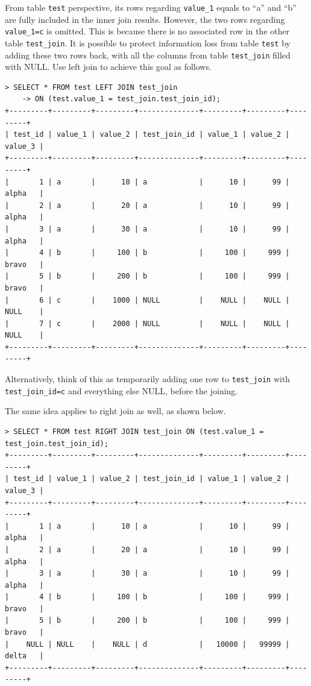 From table \verb|test| perspective, its rows regarding \verb|value_1| equals to ``a'' and ``b'' are fully included in the inner join results. However, the two rows regarding \verb|value_1=c| is omitted. This is because there is no associated row in the other table \verb|test_join|. It is possible to protect information loss from table \verb|test| by adding these two rows back, with all the columns from table \verb|test_join| filled with NULL. Use left join to achieve this goal as follows.
\begin{lstlisting}
> SELECT * FROM test LEFT JOIN test_join
    -> ON (test.value_1 = test_join.test_join_id);
+---------+---------+---------+--------------+---------+---------+---------+
| test_id | value_1 | value_2 | test_join_id | value_1 | value_2 | value_3 |
+---------+---------+---------+--------------+---------+---------+---------+
|       1 | a       |      10 | a            |      10 |      99 | alpha   |
|       2 | a       |      20 | a            |      10 |      99 | alpha   |
|       3 | a       |      30 | a            |      10 |      99 | alpha   |
|       4 | b       |     100 | b            |     100 |     999 | bravo   |
|       5 | b       |     200 | b            |     100 |     999 | bravo   |
|       6 | c       |    1000 | NULL         |    NULL |    NULL | NULL    |
|       7 | c       |    2000 | NULL         |    NULL |    NULL | NULL    |
+---------+---------+---------+--------------+---------+---------+---------+
\end{lstlisting}
Alternatively, think of this as temporarily adding one row to \verb|test_join| with \verb|test_join_id=c| and everything else NULL, before the joining.

The same idea applies to right join as well, as shown below.
\begin{lstlisting}
> SELECT * FROM test RIGHT JOIN test_join ON (test.value_1 = test_join.test_join_id);
+---------+---------+---------+--------------+---------+---------+---------+
| test_id | value_1 | value_2 | test_join_id | value_1 | value_2 | value_3 |
+---------+---------+---------+--------------+---------+---------+---------+
|       1 | a       |      10 | a            |      10 |      99 | alpha   |
|       2 | a       |      20 | a            |      10 |      99 | alpha   |
|       3 | a       |      30 | a            |      10 |      99 | alpha   |
|       4 | b       |     100 | b            |     100 |     999 | bravo   |
|       5 | b       |     200 | b            |     100 |     999 | bravo   |
|    NULL | NULL    |    NULL | d            |   10000 |   99999 | delta   |
+---------+---------+---------+--------------+---------+---------+---------+
\end{lstlisting}

